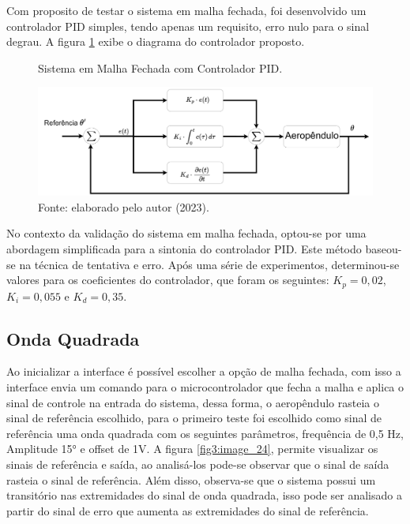 Com  proposito de testar o sistema em malha fechada, foi desenvolvido um controlador PID simples, tendo apenas um requisito, erro nulo para o sinal degrau. A figura \ref{fig3:image_23} exibe o diagrama do controlador proposto.%


\begin{figure}[!h]
	\centering
	\caption{Sistema em Malha Fechada com Controlador PID.}
	\includegraphics[width=1\textwidth]{Capitulos/3_1_resultados_discurcao/3_figuras/estrutura_pid.pdf}
	\caption*{Fonte: elaborado pelo autor (2023).}
	\label{fig3:image_23}
\end{figure}


No contexto da validação do sistema em malha fechada, optou-se por uma abordagem simplificada para a sintonia do controlador PID. Este método baseou-se na técnica de tentativa e erro. Após uma série de experimentos, determinou-se valores para os coeficientes do controlador, que foram os seguintes: $K_p=0,02$, $K_i=0,055$ e $K_d=0,35$.



\subsection{Onda Quadrada}

Ao inicializar a interface é possível escolher a opção de malha fechada, com isso a interface envia um comando para o microcontrolador que fecha a malha e aplica o sinal de controle na entrada do sistema, dessa forma, o aeropêndulo rasteia o sinal de referência escolhido, para o primeiro teste foi escolhido como sinal de referência uma onda quadrada com os seguintes parâmetros, frequência de 0,5 Hz, Amplitude 15° e offset de 1V. A figura \ref{fig3:image_24}, permite visualizar os sinais de referência e saída, ao analisá-los pode-se observar que o sinal de saída rasteia o sinal de referência. Além disso, observa-se que o sistema possui um transitório nas extremidades do sinal de onda quadrada, isso pode ser analisado a partir do sinal de erro que aumenta as extremidades do sinal de referência.

